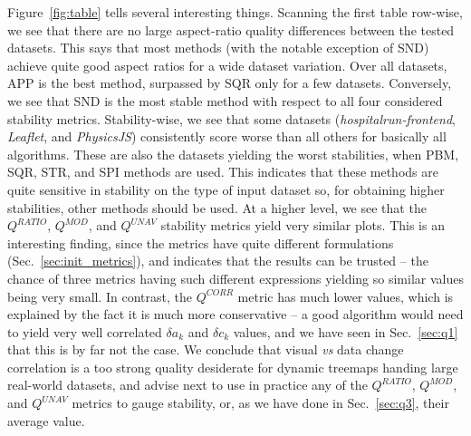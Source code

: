 Figure~\ref{fig:table} tells several interesting things. Scanning the first table row-wise, we see that there are no large aspect-ratio quality differences between the tested datasets. This says that most methods (with the notable exception of SND) achieve quite good aspect ratios for a wide dataset variation. Over all datasets, APP is the best method, surpassed by SQR only for a few datasets. Conversely, we see that SND is the most stable method with respect to all four considered stability metrics. Stability-wise, we see that some datasets (\emph{hospitalrun-frontend}, \emph{Leaflet}, and \emph{PhysicsJS}) consistently score worse than all others for basically all algorithms. These are also the datasets yielding the worst stabilities, when PBM, SQR, STR, and SPI methods are used. This indicates that these methods are quite sensitive in stability on the type of input dataset so, for obtaining higher stabilities, other methods should be used. At a higher level, we see that the $Q^{RATIO}$, $Q^{MOD}$, and $Q^{UNAV}$ stability metrics yield very similar plots. This is an interesting finding, since the metrics have quite different formulations (Sec.~\ref{sec:init_metrics}), and indicates that the results can be trusted -- the chance of three metrics having such different expressions yielding so similar values being very small. In contrast, the $Q^{CORR}$ metric has much lower values, which is explained by the fact it is much more conservative -- a good algorithm would need to yield very well correlated $\delta a_k$ and $\delta c_k$ values, and we have seen in Sec.~\ref{sec:q1} that this is by far not the case. We conclude that visual \emph{vs} data change correlation is a too strong quality desiderate for dynamic treemaps handing large real-world datasets, and advise next to use in practice any of the $Q^{RATIO}$, $Q^{MOD}$, and $Q^{UNAV}$ metrics to gauge stability, or, as we have done in Sec.~\ref{sec:q3}, their average value.

